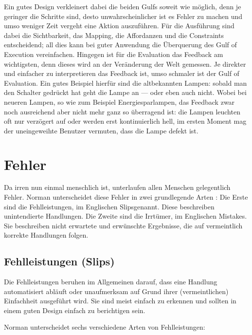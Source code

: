 \documentclass[parskip,headsepline, headtopline, %
footsepline, oneside, 12pt, headings=small]{scrreprt}
\begin{document}
Ein gutes Design verkleinert dabei die beiden Gulfs soweit wie möglich, denn je geringer die Schritte sind, desto unwahrscheinlicher ist es Fehler zu machen und umso weniger Zeit vergeht eine Aktion auszuführen. Für die Ausführung sind dabei die Sichtbarkeit, das Mapping, die Affordanzen und die Constraints entscheidend; all dies kann bei guter Anwendung die Überquerung des Gulf of Execution vereinfachen. Hingegen ist für die Evaluation das Feedback am wichtigsten, denn dieses wird an der Veränderung der Welt gemessen. Je direkter und einfacher zu interpretieren das Feedback ist, umso schmaler ist der Gulf of Evaluation. Ein gutes Beispiel hierfür sind die altbekannten Lampen: sobald man den Schalter gedrückt hat geht die Lampe an --- oder eben auch nicht. Wobei bei neueren Lampen, so wie zum Beispiel Energiesparlampen, das Feedback zwar noch ausreichend aber nicht mehr ganz so überragend ist: die Lampen leuchten oft nur verzögert auf oder werden erst kontinuierlich hell, im ersten Moment mag der uneingeweihte Benutzer vermuten, dass die Lampe defekt ist. 

\section{Fehler}

Da irren nun einmal menschlich ist, unterlaufen allen Menschen gelegentlich Fehler. Norman unterscheidet diese Fehler in zwei grundlegende Arten \cite[S. 105]{don}: Die Erste sind die Fehlleistungen, im Englischen \glqq Slips\grqq  genannt. Diese beschreiben unintendierte Handlungen. Die Zweite sind die Irrtümer, im Englischen \glqq Mistakes\grqq. Sie beschreiben nicht erwartete und erwünschte Ergebnisse, die auf vermeintlich korrekte Handlungen folgen.

\subsection{Fehlleistungen (Slips)}

Die Fehlleistungen beruhen im Allgemeinen darauf, dass eine Handlung automatisiert abläuft oder unaufmerksam auf Grund ihrer (vermeintlichen) Einfachheit ausgeführt wird. Sie sind meist einfach zu erkennen und sollten in einem guten Design einfach zu berichtigen sein.

Norman unterscheidet sechs verschiedene Arten von Fehlleistungen\cite[S. 107]{don}:
\end{document}
